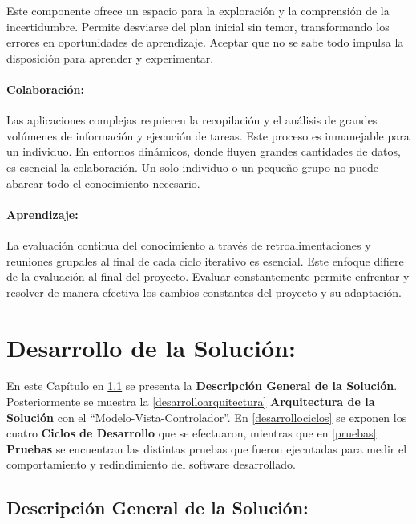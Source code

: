 \documentclass[
  12pt,
  openany]{book}
\begin{document}
Este componente ofrece un espacio para la exploración y la comprensión de la incertidumbre. Permite desviarse del plan inicial sin temor, transformando los errores en oportunidades de aprendizaje. Aceptar que no se sabe todo impulsa la disposición para aprender y experimentar.

\hypertarget{colaboraciuxf3n}{%
\subsubsection{\texorpdfstring{\textbf{Colaboración:}}{Colaboración:}}\label{colaboraciuxf3n}}

Las aplicaciones complejas requieren la recopilación y el análisis de grandes volúmenes de información y ejecución de tareas. Este proceso es inmanejable para un individuo. En entornos dinámicos, donde fluyen grandes cantidades de datos, es esencial la colaboración. Un solo individuo o un pequeño grupo no puede abarcar todo el conocimiento necesario.

\hypertarget{aprendizaje}{%
\subsubsection{\texorpdfstring{\textbf{Aprendizaje:}}{Aprendizaje:}}\label{aprendizaje}}

La evaluación continua del conocimiento a través de retroalimentaciones y reuniones grupales al final de cada ciclo iterativo es esencial. Este enfoque difiere de la evaluación al final del proyecto. Evaluar constantemente permite enfrentar y resolver de manera efectiva los cambios constantes del proyecto y su adaptación.

\hypertarget{desarrollo}{%
\chapter{Desarrollo de la Solución:}\label{desarrollo}}

En este Capítulo en \ref{desarollodescripcion} se presenta la \textbf{Descripción General de la Solución}. Posteriormente se muestra la \ref{desarrolloarquitectura} \textbf{Arquitectura de la Solución} con el ``Modelo-Vista-Controlador''. En \ref{desarrollociclos} se exponen los cuatro \textbf{Ciclos de Desarrollo} que se efectuaron, mientras que en \ref{pruebas} \textbf{Pruebas} se encuentran las distintas pruebas que fueron ejecutadas para medir el comportamiento y redindimiento del software desarrollado.

\hypertarget{desarollodescripcion}{%
\section{Descripción General de la Solución:}\label{desarollodescripcion}}
\end{document}

